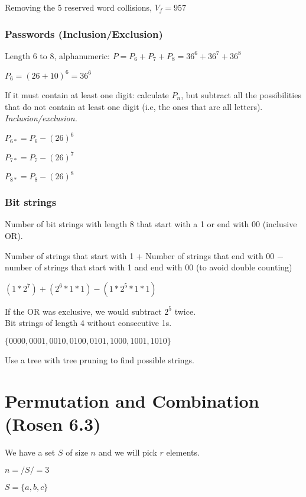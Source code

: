 \documentclass[english,openany]{book}
\begin{document}
    Removing the 5 reserved word collisions, $V_f = 957$\\

    \subsubsection{Passwords (Inclusion/Exclusion)}

    Length 6 to 8, alphanumeric: $P = P_6 + P_7 + P_8 = 36^6 + 36^7 + 36^8$

    $P_6 = (26+10)^6 = 36^6$

    If it must contain at least one digit: calculate $P_n$, but subtract all the possibilities that do not contain at least one digit (i.e, the ones that are all letters). \textit{Inclusion/exclusion.}

    $P_{6*} = P_6 - (26)^6$

    $P_{7*} = P_7 - (26)^7$

    $P_{8*} = P_8 - (26)^8$\\

    \subsubsection{Bit strings}

    Number of bit strings with length 8 that start with a 1 or end with 00 (inclusive OR).

    Number of strings that start with 1 + Number of strings that end with 00 $-$ number of strings that start with 1 and end with 00 (to avoid double counting)

    $(1 * 2^7) + (2^6 * 1 * 1) - (1 * 2^5 * 1 * 1)$

    If the OR was exclusive, we would subtract $2^5$ twice.\\

    Bit strings of length 4 without consecutive 1s.

    $\{0000, 0001, 0010, 0100, 0101, 1000, 1001, 1010\}$

    Use a tree with tree pruning to find possible strings.

    \newpage
    \section{Permutation and Combination (Rosen 6.3)}

    We have a set $S$ of size $n$ and we will pick $r$ elements.

    $n = /S/ = 3$

    $S = \{a,b,c\}$
\end{document}
